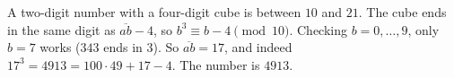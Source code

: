 A two-digit number with a four-digit cube is between $10$ and $21$. The cube ends in the same digit as $\overline{ab}-4$, so $b^3\equiv b-4\pmod{10}$. Checking $b=0,\dots,9$, only $b=7$ works ($343$ ends in $3$). So $\overline{ab}=17$, and indeed $17^3=4913=100\cdot49+17-4$. The number is $\boxed{4913}$.
